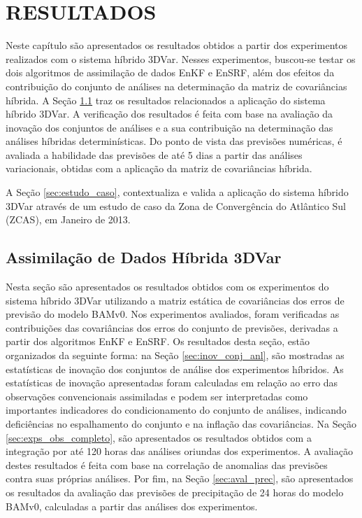 \chapter{RESULTADOS}
\label{cap:resultados}

Neste capítulo são apresentados os resultados obtidos a partir dos experimentos realizados com o sistema híbrido 3DVar. Nesses experimentos, buscou-se testar os dois algoritmos de assimilação de dados EnKF e EnSRF, além dos efeitos da contribuição do conjunto de análises na determinação da matriz de covariâncias híbrida. 
A Seção \ref{sec:assim_dados_hyb_3dvar} traz os resultados relacionados a aplicação do sistema híbrido 3DVar. A verificação dos resultados é feita com base na avaliação da inovação dos conjuntos de análises e a sua contribuição na determinação das análises híbridas determinísticas. Do ponto de vista das previsões numéricas, é avaliada a habilidade das previsões de até 5 dias a partir das análises variacionais, obtidas com a aplicação da matriz de covariâncias híbrida. 

A Seção \ref{sec:estudo_caso}, contextualiza e valida a aplicação do sistema híbrido 3DVar através de um estudo de caso da Zona de Convergência do Atlântico Sul (ZCAS), em Janeiro de 2013.

\section{Assimilação de Dados Híbrida 3DVar}
\label{sec:assim_dados_hyb_3dvar}

Nesta seção são apresentados os resultados obtidos com os experimentos do sistema híbrido 3DVar utilizando a matriz estática de covariâncias dos erros de previsão do modelo BAMv0. Nos experimentos avaliados, foram verificadas as contribuições das covariâncias dos erros do conjunto de previsões, derivadas a partir dos algoritmos EnKF e EnSRF. Os resultados desta seção, estão organizados da seguinte forma: na Seção \ref{sec:inov_conj_anl}, são mostradas as estatísticas de inovação dos conjuntos de análise dos experimentos híbridos. As estatísticas de inovação apresentadas foram calculadas em relação ao erro das observações convencionais assimiladas e podem ser interpretadas como importantes indicadores do condicionamento do conjunto de análises, indicando deficiências no espalhamento do conjunto e na inflação das covariâncias. Na Seção \ref{sec:exps_obs_completo}, são apresentados os resultados obtidos com a integração por até 120 horas das análises oriundas dos experimentos. A avaliação destes resultados é feita com base na correlação de anomalias das previsões contra suas próprias análises. Por fim, na Seção \ref{sec:aval_prec}, são apresentados os resultados da avaliação das previsões de precipitação de 24 horas do modelo BAMv0, calculadas a partir das análises dos experimentos.

